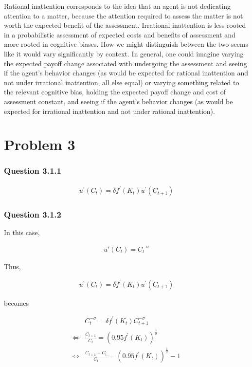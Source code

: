\documentclass[10pt]{article}
\begin{document}
Rational inattention corresponds to the idea that an agent is 
not dedicating attention to a matter, because the attention 
required to assess the matter is not worth the expected 
benefit of the assessment. Irrational inattention is less 
rooted in a probabilistic assessment of expected costs and benefits 
of assessment and more rooted in cognitive biases. How we 
might distinguish between the two seems like it would vary significantly 
by context. In general, one could imagine varying the expected payoff change
associated with 
undergoing the assessment and seeing if the agent's behavior changes (as would be 
expected for rational inattention and not under 
irrational inattention, all else equal) 
or varying something related to the relevant cognitive bias, holding 
the expected payoff change and cost of assessment constant, and seeing if the agent's behavior changes
(as would be expected for irrational inattention and not under rational inattention).

\section{Problem 3}


\subsubsection{Question 3.1.1}

\begin{align}
    u^{\prime}\left(C_t\right)=\delta f^{\prime}\left(K_t\right) u^{\prime}\left(C_{t+1}\right)
\end{align}

\subsubsection{Question 3.1.2}

In this case,

\begin{align}
    u'(C_t) = C_t^{-\sigma}
\end{align}

Thus,

\begin{align}
    u^{\prime}\left(C_t\right)=\delta f^{\prime}\left(K_t\right) u^{\prime}\left(C_{t+1}\right)
\end{align}

becomes

\begin{align}
    &C_t^{-\sigma} = \delta f^{\prime}\left(K_t\right) C_{t+1}^{-\sigma} \\
    \Leftrightarrow &\frac{C_{t+1}}{C_t} = (0.95 f^{\prime}\left(K_t\right))^{\frac{1}{\sigma}} \\ 
    \Leftrightarrow &\frac{C_{t+1} - C_t}{C_t} = (0.95 f^{\prime}\left(K_t\right))^{\frac{1}{\sigma}} - 1
\end{align}
\end{document}
